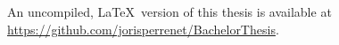 \begin{titlepage}
\begin{center}
An uncompiled, \LaTeX\ version of this thesis is available at \url{https://github.com/jorisperrenet/BachelorThesis}.

\end{center}


\end{titlepage}

